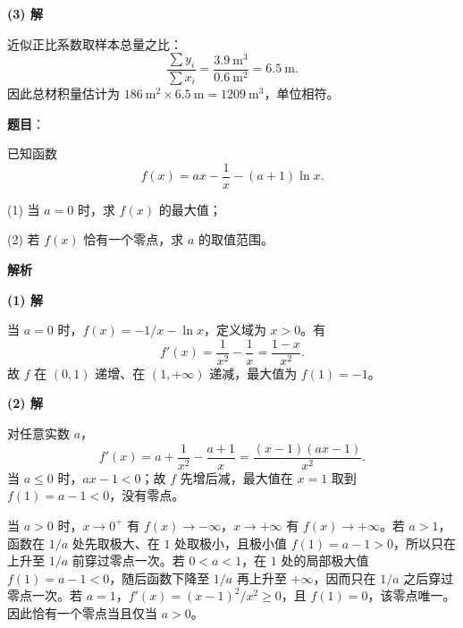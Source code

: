 \begin{answer}
\textbf{(3) 解}

近似正比系数取样本总量之比：
\nopagebreak[4]
\[
\frac{\sum y_i}{\sum x_i}=\frac{3.9\ \mathrm m^3}{0.6\ \mathrm m^2}
=6.5\ \mathrm m.
\]
因此总材积量估计为 $186\ \mathrm m^2\times6.5\ \mathrm m=1209\ \mathrm m^3$，单位相符。




\end{answer}
\begin{answer}

\textbf{题目}：

已知函数
\nopagebreak[4]
\[
f(x)=ax-\frac1x-(a+1)\ln x.
\]

(1) 当 $a=0$ 时，求 $f(x)$ 的最大值；

(2) 若 $f(x)$ 恰有一个零点，求 $a$ 的取值范围。

\textbf{解析}

\textbf{(1) 解}

当 $a=0$ 时，$f(x)=-1/x-\ln x$，定义域为 $x>0$。有
\nopagebreak[4]
\[
f'(x)=\frac1{x^2}-\frac1x=\frac{1-x}{x^2}.
\]
故 $f$ 在 $(0,1)$ 递增、在 $(1,+\infty)$ 递减，最大值为 $f(1)=-1$。

\textbf{(2) 解}

对任意实数 $a$，
\nopagebreak[4]
\[
f'(x)=a+\frac1{x^2}-\frac{a+1}{x}
=\frac{(x-1)(ax-1)}{x^2}.
\]
当 $a\le0$ 时，$ax-1<0$；故 $f$ 先增后减，最大值在 $x=1$ 取到 $f(1)=a-1<0$，没有零点。

当 $a>0$ 时，$x\to0^+$ 有 $f(x)\to-\infty$，$x\to+\infty$ 有 $f(x)\to+\infty$。若 $a>1$，函数在 $1/a$ 处先取极大、在 $1$ 处取极小，且极小值 $f(1)=a-1>0$，所以只在上升至 $1/a$ 前穿过零点一次。若 $0<a<1$，在 $1$ 处的局部极大值 $f(1)=a-1<0$，随后函数下降至 $1/a$ 再上升至 $+\infty$，因而只在 $1/a$ 之后穿过零点一次。若 $a=1$，$f'(x)=(x-1)^2/x^2\ge0$，且 $f(1)=0$，该零点唯一。因此恰有一个零点当且仅当 $a>0$。



\end{answer}
